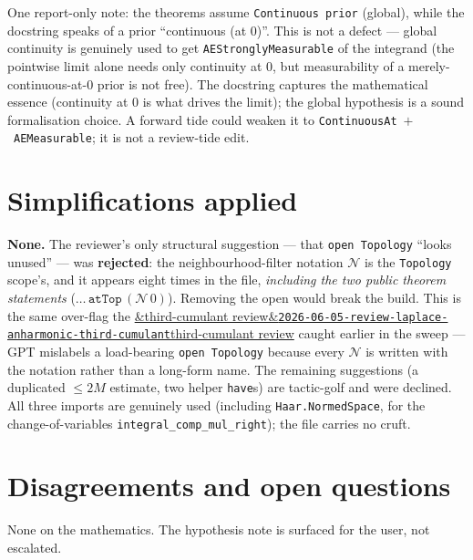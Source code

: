 \documentclass[11pt]{article}
\newcommand{\reviewref}[2][]{\href{https://therisensea.org/reviews/#2/}{\ifx&#1&\texttt{#2}\else#1\fi}}
\begin{document}
One report-only note: the theorems assume \texttt{Continuous prior} (global), while the docstring speaks of a
prior ``continuous (at 0)''. This is not a defect --- global continuity is genuinely used to get
\texttt{AEStronglyMeasurable} of the integrand (the pointwise limit alone needs only continuity at $0$, but
measurability of a merely-continuous-at-$0$ prior is not free). The docstring captures the mathematical
essence (continuity at $0$ is what drives the limit); the global hypothesis is a sound formalisation choice.
A forward tide could weaken it to \texttt{ContinuousAt}~$+$~\texttt{AEMeasurable}; it is not a review-tide
edit.

\section{Simplifications applied}
\textbf{None.} The reviewer's only structural suggestion --- that \texttt{open Topology} ``looks unused'' ---
was \textbf{rejected}: the neighbourhood-filter notation $\mathcal N$ is the \texttt{Topology} scope's, and it
appears eight times in the file, \emph{including the two public theorem statements} ($\ldots\,\mathtt{atTop}\,
(\mathcal N\,0)$). Removing the open would break the build. This is the same over-flag the
\reviewref[third-cumulant review]{2026-06-05-review-laplace-anharmonic-third-cumulant} caught earlier in the
sweep --- GPT mislabels a load-bearing \texttt{open Topology} because every $\mathcal N$ is written with the
notation rather than a long-form name. The remaining suggestions (a duplicated $\le 2M$ estimate, two helper
\texttt{have}s) are tactic-golf and were declined. All three imports are genuinely used (including
\texttt{Haar.NormedSpace}, for the change-of-variables \texttt{integral\_comp\_mul\_right}); the file carries
no cruft.

\section{Disagreements and open questions}
None on the mathematics. The hypothesis note is surfaced for the user, not escalated.
\end{document}
